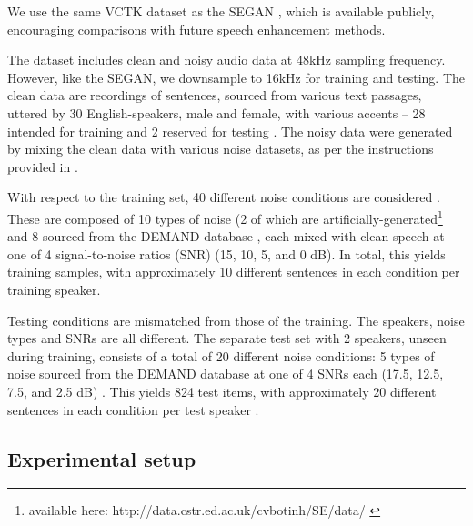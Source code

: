 \documentclass{article}
\begin{document}
We use the same VCTK dataset \citep{Valentini-Botinhao2017Noisysound} as the SEGAN \cite{Pascual2017}, which is available publicly, encouraging comparisons with future speech enhancement methods.

The dataset includes clean and noisy audio data at 48kHz sampling frequency.
However, like the SEGAN, we downsample to 16kHz for training and testing.
The clean data are recordings of sentences, sourced from various text passages, uttered by 30 English-speakers, male and female, with various accents – 28 intended for training and 2 reserved for testing \citep{Valentini-Botinhao2016SpeechNetworks}. 
The noisy data were generated by mixing the clean data with various noise datasets, as per the instructions provided in \citep{Pascual2017, Valentini-Botinhao2017Noisysound, Valentini-Botinhao+2016}. 

With respect to the training set, 40 different noise conditions are considered \citep{Pascual2017, Valentini-Botinhao2016SpeechNetworks}. 
These are composed of 10 types of noise (2 of which are artificially-generated\footnote{available here: http://data.cstr.ed.ac.uk/cvbotinh/SE/data/ \citep{Valentini-Botinhao2017Noisysound}} and 8 sourced from the DEMAND database \citep{Thiemann2013TheRecord-ings}, each mixed with clean speech at one of 4 signal-to-noise ratios (SNR) (15, 10, 5, and 0 dB). 
In total, this yields  training samples, with approximately 10 different sentences in each condition per training speaker.

Testing conditions are mismatched from those of the training. The speakers, noise types and SNRs are all different. The separate test set with 2 speakers, unseen during training, consists of a total of 20 different noise conditions: 5 types of noise sourced from the DEMAND database at one of 4 SNRs each (17.5, 12.5, 7.5, and 2.5 dB) \citep{Valentini-Botinhao2017Noisysound, Valentini-Botinhao+2016}. This yields 824 test items, with approximately 20 different sentences in each condition per test speaker \citep{Valentini-Botinhao2017Noisysound, Valentini-Botinhao+2016}.


\subsection{Experimental setup}
\end{document}
